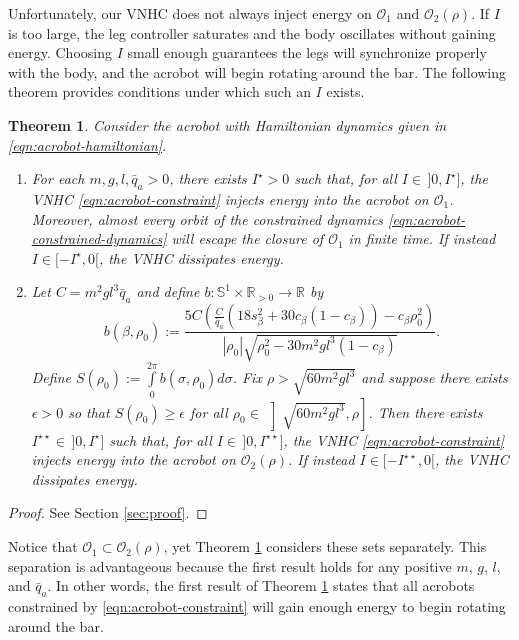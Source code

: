 \documentclass[journal,twoside,web, onecolumn, draftcls]{ieeecolor}
\newtheorem{thm}{Theorem}%
\newcommand*{\R}{\mathbb{R}}
\newcommand*{\Sone}{\mathbb{S}^1}
\newcommand*{\SxR}{\Sone \times \R}
\begin{document}
Unfortunately, our VNHC does not always inject energy on \(\mathcal{O}_1\) and
\(\mathcal{O}_2(\rho)\).
If \(I\) is too large, the leg controller saturates and the body oscillates
without gaining energy.
Choosing \(I\) small enough guarantees the legs will synchronize
properly with the body, and the acrobot will begin rotating around the bar.
The following theorem provides conditions under which such an \(I\) exists.

\begin{thm}\label{thm:acrobot-energy-stabilization}
    Consider the acrobot with Hamiltonian dynamics given in
    \eqref{eqn:acrobot-hamiltonian}.
\begin{enumerate}
    \item For each \(m, g, l, \bar{q}_a > 0\), there exists
        \(I^\star > 0\) such that, for all \(I \in \, ]0,I^\star]\), the VNHC
        \eqref{eqn:acrobot-constraint} injects energy into the acrobot on
        \(\mathcal{O}_1\).
        Moreover, almost every orbit of the constrained dynamics 
        \eqref{eqn:acrobot-constrained-dynamics} will escape the closure of
        \(\mathcal{O}_1\) in finite time.
        If instead \(I \in [-I^\star,0[\), the VNHC dissipates energy.
    \item Let \(C = m^2gl^3\bar{q}_a\) and 
        define \(b : \SxR_{> 0} \rightarrow \R\) by
    \[
        b(\beta,\rho_0) := 
        \frac{5C \left(
        \frac{C}{\bar{q}_a}\left(18s_\beta^2 + 30c_\beta(1 - c_\beta)\right)
            - c_\beta\rho_0^2
        \right)}{
        |\rho_0|\sqrt{\rho_0^2 - 30m^2gl^3(1 - c_\beta)}
        }
        .
    \]
        Define 
        \(S(\rho_0) := \int \limits_{0}^{2\pi} b(\sigma,\rho_0)d\sigma\).
        Fix \(\rho > \sqrt{60m^2gl^3}\) and
        suppose there exists \(\epsilon > 0\) so that 
        \(S(\rho_0) \geq \epsilon\) for all 
        \(\rho_0 \in \, \left]\sqrt{60m^2gl^3}, \rho\right]\).
        Then there exists \(I^{\star\star} \in \, ]0, I^\star]\) such that, for all 
        \(I \in \, ]0,I^{\star\star}]\), the VNHC
        \eqref{eqn:acrobot-constraint} injects energy into the acrobot on
        \(\mathcal{O}_2(\rho)\).
        If instead \(I \in [-I^{\star\star},0[\), the VNHC dissipates energy.
\end{enumerate}
\end{thm}
\begin{proof}
    See Section \ref{sec:proof}.
\end{proof}

Notice that \(\mathcal{O}_1 \subset \mathcal{O}_2(\rho)\), yet
Theorem \ref{thm:acrobot-energy-stabilization} considers these sets separately.
This separation is advantageous because the first result holds for any positive
\(m\), \(g\), \(l\), and \(\bar{q}_a\). 
In other words, the first result of Theorem
\ref{thm:acrobot-energy-stabilization} states that all acrobots constrained by
\eqref{eqn:acrobot-constraint} will gain enough energy to begin rotating around
the bar.
\end{document}
